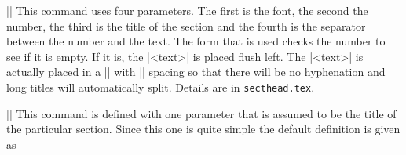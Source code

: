 \mbr
\ext\@||
\nbr
This command uses four parameters. The first is the font, the second the
number, the third is the title of the section and the fourth is the separator
between the number and the text. The form that is used checks the number to
see if it is empty. If it is, the |<text>| is placed flush left. The |<text>|
is actually placed in a |\vbox| with |\veryraggedright| spacing so that there
will be no hyphenation and long titles will automatically split. Details are
in {\tt secthead.tex}. 

\mbr
\ext\@||
\nbr
This command is defined with one parameter that is assumed to be the title of
the particular section. Since this one is quite simple the default definition
is given as 
\begintt
\def\preludeheadformat#1{\centerline{\sheadfont #1}\vskip 1cm}
\endtt
\endblockmode
\ejectpage
\done





